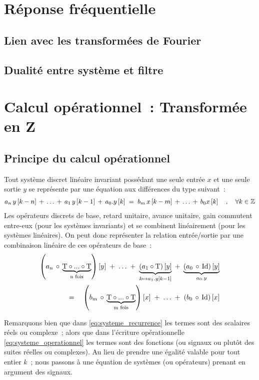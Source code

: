 \section{Réponse fréquentielle}
\subsection{Lien avec les transformées de Fourier}
\subsection{Dualité entre système et filtre}



\section{Calcul opérationnel~: Transformée en Z}


\subsection{Principe du calcul opérationnel}
\label{sec:calcul_operationnel}
Tout système discret linéaire invariant possédant une seule entrée $x$ et
une seule sortie $y$ se représente par une équation aux différences du
type suivant~:
\begin{eqnarray}
  \label{eq:systeme_recurrence}
  a_n\,y\left[k-n\right] \,+\, \ldots  \,+\,  a_1\,y\left[k-1\right] \,+\, a_0.y\left[k\right] \;=\; b_m\,x\left[k-m\right] \,+\, \ldots \,+\, b_0 x\left[k\right] \quad,\quad \forall k\in\mathbb{Z}
\end{eqnarray}
Les opérateurs discrets de base, retard unitaire, avance unitaire,
gain commutent entre-eux (pour les systèmes invariants) et se combinent
linéairement (pour les systèmes linéaires). On peut donc représenter la
relation entrée/sortie par une combinaison linéaire de ces opérateurs
de base~:
\begin{eqnarray}
  \label{eq:systeme_operationnel}
  \left(a_n\,\circ\,\underbrace{\mathrm{T}\circ...\circ \mathrm{T}}_{\text{n fois}}\right)\left[y\right]\; +\; \ldots \;+\; \underbrace{\left(a_1\circ\mathrm{T}\right)\left[y\right]}_{k\mapsto a_1.y\left[k-1\right]} \;+\; \underbrace{\left(a_0 \,\circ\, \mathrm{Id}\right)\left[y\right]}_{a_0.y} \\
  =\quad \left(b_m\,\circ\,\underbrace{\mathrm{T}\circ...\circ \mathrm{T}}_{\text{m fois}}\right)\left[x\right] \;+\; \ldots \;+\; \left(b_0 \,\circ\,\mathrm{Id}\right)\left[x\right]
\end{eqnarray}

\begin{remarque}
  Remarquons bien que dans \eqref{eq:systeme_recurrence} les termes
  sont des scalaires réels ou complexe~; alors que dans l'écriture
  opérationnelle \eqref{eq:systeme_operationnel} les termes sont des
  fonctions (ou signaux ou plutôt des suites réelles ou complexes). Au
  lieu de prendre une égalité valable pour tout entier $k$~; nous
  passons à une équation de systèmes (ou opérateurs) prenant en
  argument des signaux.
\end{remarque}


